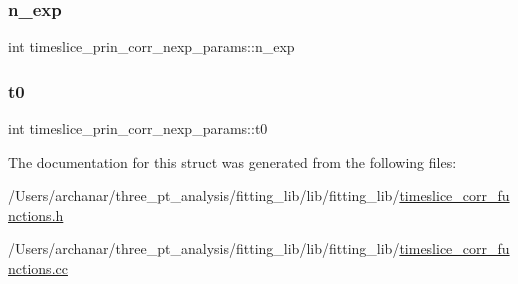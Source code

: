 \subsubsection{\texorpdfstring{n\_exp}{n\_exp}}
{\footnotesize\ttfamily int timeslice\+\_\+prin\+\_\+corr\+\_\+nexp\+\_\+params\+::n\+\_\+exp}

\mbox{\label{structtimeslice__prin__corr__nexp__params_a0398087a40ff9b89ebff00ae5c298070}} 
\subsubsection{\texorpdfstring{t0}{t0}}
{\footnotesize\ttfamily int timeslice\+\_\+prin\+\_\+corr\+\_\+nexp\+\_\+params\+::t0}



The documentation for this struct was generated from the following files\+:\begin{DoxyCompactItemize}
\item 
/\+Users/archanar/three\+\_\+pt\+\_\+analysis/fitting\+\_\+lib/lib/fitting\+\_\+lib/\mbox{\hyperlink{lib_2fitting__lib_2timeslice__corr__functions_8h}{timeslice\+\_\+corr\+\_\+functions.\+h}}\item 
/\+Users/archanar/three\+\_\+pt\+\_\+analysis/fitting\+\_\+lib/lib/fitting\+\_\+lib/\mbox{\hyperlink{timeslice__corr__functions_8cc}{timeslice\+\_\+corr\+\_\+functions.\+cc}}\end{DoxyCompactItemize}
